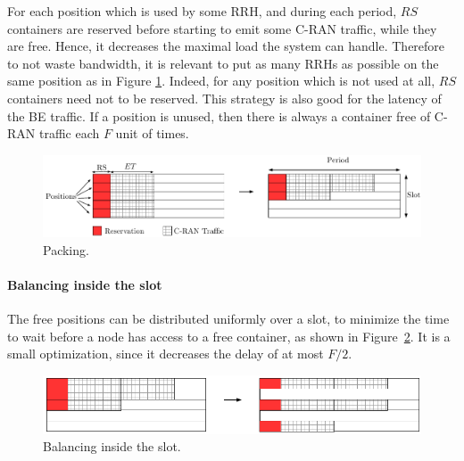 \documentclass[10pt, conference, letterpaper]{IEEEtran}
\begin{document}
For each position which is used by some RRH, and during each period, $RS$ containers are reserved before starting to emit some C-RAN traffic, while they are free. Hence, it decreases the maximal load the system can handle.
Therefore to not waste bandwidth, it is relevant to put as many RRHs as possible on the same position as in Figure \ref{fig:packing}. Indeed, for any position which is not used at all, $RS$ containers need not to be reserved. This strategy is also good for the latency of the BE traffic. If a position is unused, then there is always a container free of C-RAN traffic each $F$ unit of times.

\begin{figure}[h!]
\begin{center}

      \includegraphics[scale=0.5]{repart0}
     \caption{Packing.}\label{fig:packing}

\end{center}
  \end{figure}

\paragraph{Balancing inside the slot}

The free positions can be distributed uniformly over a slot, to minimize the time to wait before a node
has access to a free container, as shown in Figure~\ref{fig:slotbal}. It is a small optimization, since
it decreases the delay of at most $F/2$.

\begin{figure}[h!]
\begin{center}

      \includegraphics[scale=0.55]{repart1}
     \caption{Balancing inside the slot.}\label{fig:slotbal}

\end{center}
  \end{figure}
\end{document}
